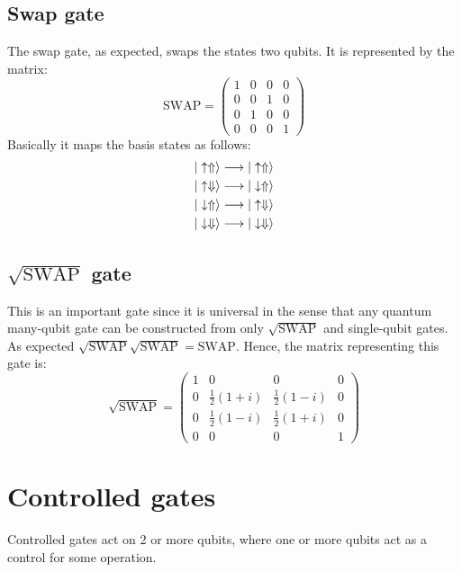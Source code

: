 \subsection{Swap gate}
The swap gate, as expected, swaps the states two qubits. It is represented by the matrix:
\begin{equation}
  \text{SWAP} = \left(\begin{array}{cccc}
  1 & 0 & 0 & 0 \\
  0 & 0 & 1 & 0 \\
  0 & 1 & 0 & 0 \\
  0 & 0 & 0 & 1
  \end{array}\right)
\end{equation}
Basically it maps the basis states as follows:
\begin{equation}
  \begin{split}
    |\uparrow\Uparrow\rangle \longrightarrow |\uparrow\Uparrow\rangle\\
    |\uparrow\Downarrow\rangle \longrightarrow |\downarrow\Uparrow\rangle\\
    |\downarrow\Uparrow\rangle \longrightarrow |\uparrow\Downarrow\rangle\\
    |\downarrow\Downarrow\rangle \longrightarrow |\downarrow\Downarrow\rangle
  \end{split}
\end{equation}



\subsection{$\sqrt{\text{SWAP}}$ gate}
This is an important gate since it is universal in the sense that any quantum many-qubit gate can be constructed from only $\sqrt{\text{SWAP}}$ and single-qubit gates. As expected $\sqrt{\text{SWAP}}\sqrt{\text{SWAP}}=\text{SWAP}$. Hence, the matrix representing this gate is:
\begin{equation}
  \sqrt{\text{SWAP}} = \left(\begin{array}{cccc}
  1 & 0 & 0 & 0 \\
  0 & \frac{1}{2}(1+i) & \frac{1}{2}(1-i) & 0 \\
  0 & \frac{1}{2}(1-i) & \frac{1}{2}(1+i) & 0 \\
  0 & 0 & 0 & 1
  \end{array}\right)
\end{equation}

\section{Controlled gates}
Controlled gates act on 2 or more qubits, where one or more qubits act as a control for some operation.
